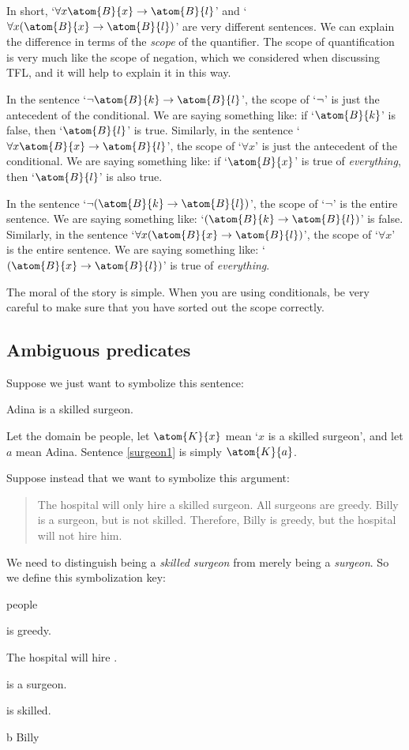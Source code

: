 In short, `$\forall x \atom{B}{x} \eif \atom{B}{l}$' and `$\forall x (\atom{B}{x} \eif \atom{B}{l})$' are very different sentences. We can explain the difference in terms of the \emph{scope} of the quantifier. The scope of quantification is very much like the scope of negation, which we considered when discussing TFL, and it will help to explain it in this way.

In the sentence `$\enot \atom{B}{k} \eif \atom{B}{l}$', the scope of `$\neg$' is just the antecedent of the conditional. We are saying something like: if `$\atom{B}{k}$' is false, then `$\atom{B}{l}$' is true. Similarly, in the sentence `$\forall x \atom{B}{x} \eif \atom{B}{l}$', the scope of `$\forall x$' is just the antecedent of the conditional. We are saying something like: if `$\atom{B}{x}$' is true of \emph{everything}, then `$\atom{B}{l}$' is also true.

In the sentence `$\enot(\atom{B}{k} \eif \atom{B}{l})$', the scope of `$\neg$' is the entire sentence. We are saying something like: `$(\atom{B}{k} \eif \atom{B}{l})$' is false. Similarly, in the sentence `$\forall x (\atom{B}{x} \eif \atom{B}{l})$', the scope of `$\forall x$' is the entire sentence. We are saying something like: `$(\atom{B}{x} \eif \atom{B}{l})$' is true of \emph{everything}.

The moral of the story is simple. When you are using conditionals, be very careful to make sure that you have sorted out the scope correctly.

\subsection{Ambiguous predicates}

Suppose we just want to symbolize this sentence:
\begin{earg}
\item[\ex{surgeon1}] Adina is a skilled surgeon.
\end{earg}
Let the domain be people, let $\atom{K}{x}$ mean `$x$ is a skilled surgeon', and let $a$ mean Adina. Sentence \ref{surgeon1} is simply $\atom{K}{a}$.


Suppose instead that we want to symbolize this argument:
\begin{quote}
The hospital will only hire a skilled surgeon. All surgeons are greedy. Billy is a surgeon, but is not skilled. Therefore, Billy is greedy, but the hospital will not hire him.
\end{quote}
We need to distinguish being a \emph{skilled surgeon} from merely being a \emph{surgeon}. So we define this symbolization key:
\begin{ekey}
\item[\text{domain}] people
\item[\atom{G}{x}]  is greedy.
\item[\atom{H}{x}] The hospital will hire .
\item[\atom{R}{x}]  is a surgeon.
\item[\atom{K}{x}]  is skilled.
\item[b] Billy
\end{ekey}

